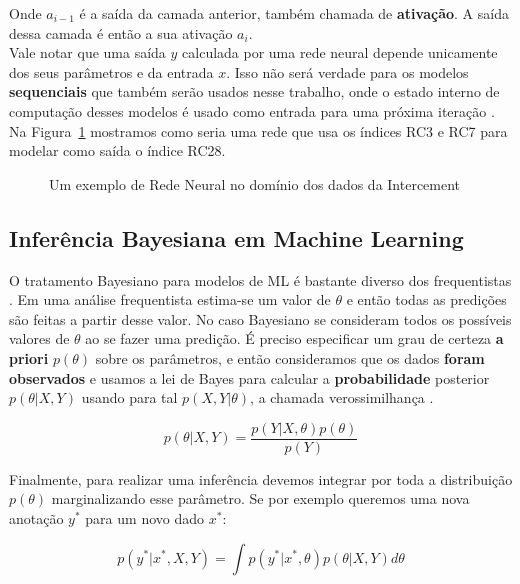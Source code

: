 Onde $a_{i-1}$ é a saída da camada anterior, também chamada de
\textbf{ativação}. A saída dessa camada é então a sua ativação $a_i$. \\ 

Vale notar que uma saída $y$ calculada por uma rede neural depende unicamente dos
seus parâmetros e da entrada $x$. Isso não será verdade para os modelos
\textbf{sequenciais} que também serão usados nesse trabalho, onde o estado
interno de computação desses modelos é usado como entrada para uma próxima
iteração \citep{dlbook}. \\

Na Figura~\ref{fig:nn} mostramos como seria uma rede que usa os índices RC3 e RC7 para
modelar como saída o índice RC28. \\  

\begin{figure}
  \centering
  
  \caption{Um exemplo de Rede Neural no domínio dos dados da Intercement}
  \label{fig:nn}
\end{figure}


\bigskip


\subsection{Inferência Bayesiana em Machine Learning}
\label{sec:bayesinf}
O tratamento Bayesiano para modelos de ML é bastante diverso dos frequentistas \citep{dlbook}.
Em uma análise frequentista estima-se um valor de $\theta$ e então todas as
predições são feitas a partir desse valor. No caso Bayesiano se consideram todos
os possíveis valores de $\theta$ ao se fazer uma predição. É preciso especificar
um grau de certeza \textbf{a priori} $p(\theta)$ sobre os parâmetros, e então
consideramos que os dados \textbf{foram observados} e usamos a lei de Bayes para
calcular a \textbf{probabilidade} posterior $p(\theta | X,Y)$ usando para tal
$p(X,Y | \theta)$, a chamada verossimilhança \citep{bayesml}. 

\[    p(\theta | X,Y) = \frac{p(Y| X,\theta) p(\theta)}{p(Y)}   \]

Finalmente, para realizar uma inferência devemos integrar por toda a distribuição $p(\theta)$ marginalizando esse parâmetro. Se por exemplo queremos uma nova anotação $y^*$ para um novo dado $x^*$:


\begin{equation}
  \label{eq:int}
p(y^* | x^* , X,Y) = \int  p(y^* | x^*,\theta) p(\theta | X,Y)  d\theta 
\end{equation}


